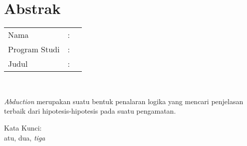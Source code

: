 %
%
%

\chapter*{Abstrak}

\vspace*{0.2cm}

\noindent \begin{tabular}{l l p{10cm}}
	Nama&: & \penulis \\
	Program Studi&: & \program \\
	Judul&: & \judul \\
\end{tabular} \\ 

\vspace*{0.5cm}

\noindent 
\textit{Abduction} merupakan suatu bentuk penalaran logika yang mencari penjelasan terbaik dari hipotesis-hipotesis pada suatu pengamatan. \textit{}

\vspace*{0.2cm}

\noindent Kata Kunci: \\ 
\noindent atu, dua, \textit{tiga}\\ 

\newpage